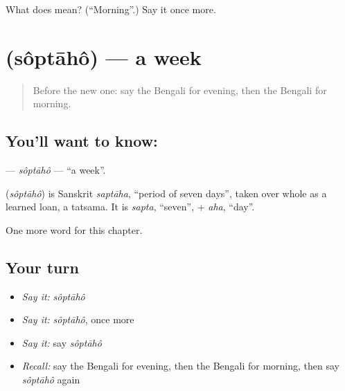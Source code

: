 \begin{tcolorbox}[breakable,colback=teal!4,colframe=teal!35!black,title={Before you move on}]
What does  mean? (\textquotedblleft{}Morning\textquotedblright{}.) Say it once more.
\end{tcolorbox}
\section[\texorpdfstring{\bn{সপ্তাহ} (sôptāhô)}{সপ্তাহ (sôptāhô)}]{ (sôptāhô) — a week}

\label{lesson:BN-C78-soptaho}



\begin{quote}
Before the new one: say the Bengali for evening, then the Bengali for morning.
\end{quote}

\subsection*{You'll want to know: }
\textbf{} — \emph{sôptāhô} — \textquotedblleft{}a week\textquotedblright{}.

\begin{cousinweb}
\textbf{} (\emph{sôptāhô}) is Sanskrit \emph{saptāha}, \textquotedblleft{}period of seven days\textquotedblright{}, taken over whole as a learned loan, a tatsama. It is \emph{sapta}, \textquotedblleft{}seven\textquotedblright{}, + \emph{aha}, \textquotedblleft{}day\textquotedblright{}.
\end{cousinweb}

\begin{grammarlens}[title={What you've built}]
One more word for this chapter.
\end{grammarlens}

\subsection*{Your turn}
\begin{itemize}
\raggedright
  \item \emph{Say it:} \emph{sôptāhô}
  \item \emph{Say it:} \emph{sôptāhô}, once more
  \item \emph{Say it:} say \emph{sôptāhô}
  \item \emph{Recall:} say the Bengali for evening, then the Bengali for morning, then say \emph{sôptāhô} again
\end{itemize}

